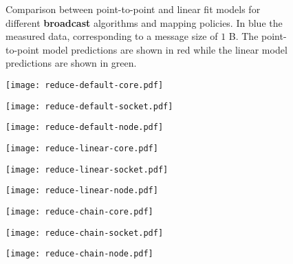 \documentclass[../main.tex]{subfiles}
\begin{document}
\begin{figure}[p]
    \caption{Comparison between point-to-point and linear fit models for different \textbf{broadcast} algorithms and mapping policies. In blue the measured data, corresponding to a message size of $1$ B. The point-to-point model predictions are shown in red while the linear model predictions are shown in green.}
    \label{fig:reduce-results}
\end{figure}

\begin{figure}[p]
    \begin{adjustwidth}{-1.5cm}{-1.5cm}
    \centering
    \begin{minipage}{0.40\textwidth}
        \centering
        \texttt{[image: reduce-default-core.pdf]}
    \end{minipage}\hfill
    \begin{minipage}{0.40\textwidth}
        \centering
        \texttt{[image: reduce-default-socket.pdf]}
    \end{minipage}\hfill
    \begin{minipage}{0.40\textwidth}
        \centering
        \texttt{[image: reduce-default-node.pdf]}
    \end{minipage}
    \begin{minipage}{0.40\textwidth}
        \centering
        \texttt{[image: reduce-linear-core.pdf]}
    \end{minipage}\hfill
    \begin{minipage}{0.40\textwidth}
        \centering
        \texttt{[image: reduce-linear-socket.pdf]}
    \end{minipage}\hfill
    \begin{minipage}{0.40\textwidth}
        \centering
        \texttt{[image: reduce-linear-node.pdf]}
    \end{minipage}
    \begin{minipage}{0.40\textwidth}
        \centering
        \texttt{[image: reduce-chain-core.pdf]}
    \end{minipage}\hfill
    \begin{minipage}{0.40\textwidth}
        \centering
        \texttt{[image: reduce-chain-socket.pdf]}
    \end{minipage}\hfill
    \begin{minipage}{0.40\textwidth}
        \centering
        \texttt{[image: reduce-chain-node.pdf]}
    \end{minipage}

\end{adjustwidth}
\end{figure}
\end{document}
